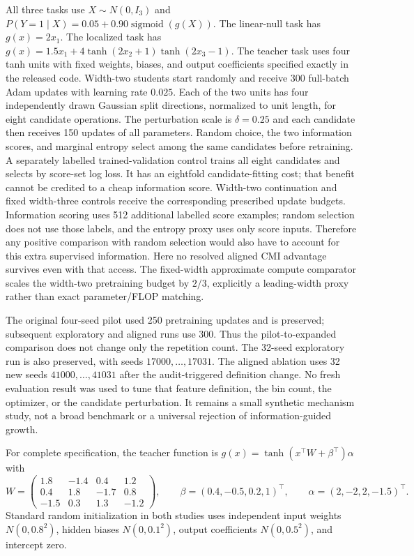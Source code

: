 All three tasks use $X\sim N(0,I_3)$ and
$P(Y=1\mid X)=0.05+0.90\operatorname{sigmoid}(g(X))$.
The linear-null task has $g(x)=2x_1$. The localized task has
$g(x)=1.5x_1+4\tanh(2x_2+1)\tanh(2x_3-1)$.
The teacher task uses four tanh units with fixed weights, biases, and output
coefficients specified exactly in the released code. Width-two students start
randomly and receive 300 full-batch Adam updates with learning rate $0.025$.
Each of the two units has four independently drawn Gaussian split directions,
normalized to unit length, for eight candidate operations. The perturbation
scale is $\delta=0.25$ and each candidate then receives 150 updates of all
parameters. Random choice, the two information scores, and marginal entropy
select among the same candidates before retraining. A separately labelled
trained-validation control trains all eight candidates and selects by score-set
log loss. It has an eightfold candidate-fitting cost; that benefit cannot be
credited to a cheap information score. Width-two continuation and fixed
width-three controls receive the corresponding prescribed update budgets.
Information scoring uses 512 additional labelled score examples; random
selection does not use those labels, and the entropy proxy uses only score
inputs. Therefore any positive comparison with random selection would also
have to account for this extra supervised information. Here no resolved aligned
CMI advantage survives even with that access. The fixed-width approximate
compute comparator scales the width-two pretraining budget by $2/3$, explicitly a leading-width proxy rather than exact
parameter/FLOP matching.

The original four-seed pilot used 250 pretraining updates and is preserved;
subsequent exploratory and aligned runs use 300. Thus the pilot-to-expanded
comparison does not change only the repetition count. The 32-seed exploratory
run is also preserved, with seeds $17000,\ldots,17031$. The aligned ablation uses 32 new seeds
$41000,\ldots,41031$ after the audit-triggered definition change. No fresh evaluation
result was used to tune that feature definition, the bin count, the optimizer,
or the candidate perturbation. It remains a small synthetic mechanism study,
not a broad benchmark or a universal rejection of information-guided growth.

For complete specification, the teacher function is
$g(x)=\tanh(x^\top W+\beta^\top)\alpha$ with
\[
 W=\begin{pmatrix}
 1.8&-1.4&0.4&1.2\\
 0.4&1.8&-1.7&0.8\\
 -1.5&0.3&1.3&-1.2
 \end{pmatrix},\qquad
 \beta=(0.4,-0.5,0.2,1)^\top,\qquad
 \alpha=(2,-2,2,-1.5)^\top.
\]
Standard random initialization in both studies uses independent input weights
$N(0,0.8^2)$, hidden biases $N(0,0.1^2)$, output coefficients
$N(0,0.5^2)$, and intercept zero.

